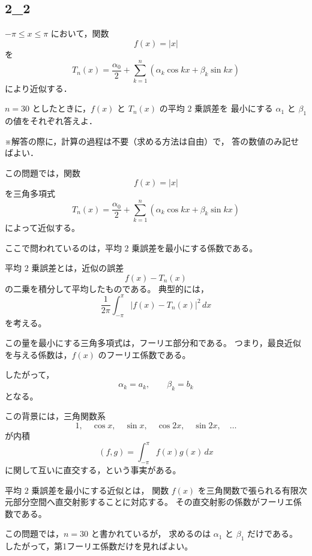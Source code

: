\subsection{2_2}
\begin{exercise}
	\(-\pi \leq x \leq \pi\) において，関数
	\[
	f(x)=|x|
	\]
	を
	\[
	T_n(x)=\frac{\alpha_0}{2}
	+\sum_{k=1}^{n}
	\left(
	\alpha_k\cos kx+\beta_k\sin kx
	\right)
	\]
	により近似する．
	
	\(n=30\) としたときに，\(f(x)\) と \(T_n(x)\) の平均 \(2\) 乗誤差を
	最小にする \(\alpha_1\) と \(\beta_1\) の値をそれぞれ答えよ．
	
	\medskip
	
	※解答の際に，計算の過程は不要（求める方法は自由）で，
	答の数値のみ記せばよい．
\end{exercise}
\begin{background}
	この問題では，関数
	\[
	f(x)=|x|
	\]
	を三角多項式
	\[
	T_n(x)
	=
	\frac{\alpha_0}{2}
	+
	\sum_{k=1}^{n}
	\left(
	\alpha_k\cos kx+\beta_k\sin kx
	\right)
	\]
	によって近似する。
	
	ここで問われているのは，平均 \(2\) 乗誤差を最小にする係数である。
	
	平均 \(2\) 乗誤差とは，近似の誤差
	\[
	f(x)-T_n(x)
	\]
	の二乗を積分して平均したものである。
	典型的には，
	\[
	\frac{1}{2\pi}
	\int_{-\pi}^{\pi}
	\left|f(x)-T_n(x)\right|^2\,dx
	\]
	を考える。
	
	この量を最小にする三角多項式は，フーリエ部分和である。
	つまり，最良近似を与える係数は，\(f(x)\) のフーリエ係数である。
	
	したがって，
	\[
	\alpha_k=a_k,\qquad \beta_k=b_k
	\]
	となる。
	
	この背景には，三角関数系
	\[
	1,\quad \cos x,\quad \sin x,\quad \cos 2x,\quad \sin 2x,\quad \ldots
	\]
	が内積
	\[
	(f,g)=\int_{-\pi}^{\pi}f(x)g(x)\,dx
	\]
	に関して互いに直交する，という事実がある。
	
	平均 \(2\) 乗誤差を最小にする近似とは，
	関数 \(f(x)\) を三角関数で張られる有限次元部分空間へ直交射影することに対応する。
	その直交射影の係数がフーリエ係数である。
	
	この問題では，\(n=30\) と書かれているが，
	求めるのは \(\alpha_1\) と \(\beta_1\) だけである。
	したがって，第1フーリエ係数だけを見ればよい。
\end{background}
